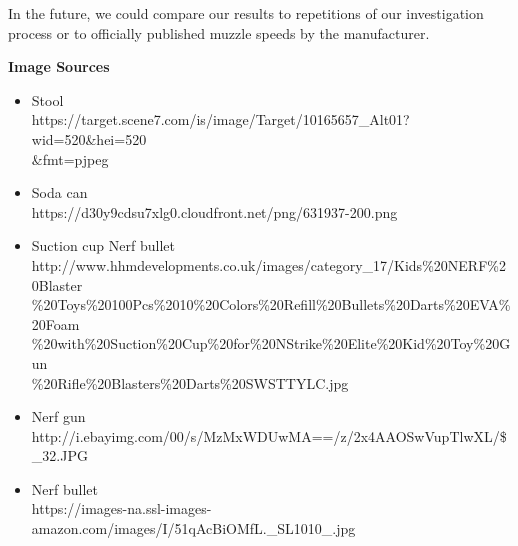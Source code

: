 \documentclass[12pt]{article}
\newcommand{\double}[0]{\par\null\par}
\newcommand{\bigheader}[1]{\LARGE\textbf{#1}\normalsize}
\begin{document}
In the future, we could compare our results to repetitions of our investigation process or to officially published muzzle
speeds by the manufacturer.

\double\bigheader{Image Sources}

\begin{itemize}
\item Stool \\
https://target.scene7.com/is/image/Target/10165657\_Alt01?wid=520\&hei=520\\
\&fmt=pjpeg
\item Soda can \\
https://d30y9cdsu7xlg0.cloudfront.net/png/631937-200.png
\item Suction cup Nerf bullet \\
http://www.hhmdevelopments.co.uk/images/category\_17/Kids\%20NERF\%20Blaster\\
\%20Toys\%20100Pcs\%2010\%20Colors\%20Refill\%20Bullets\%20Darts\%20EVA\%20Foam\\
\%20with\%20Suction\%20Cup\%20for\%20NStrike\%20Elite\%20Kid\%20Toy\%20Gun\\
\%20Rifle\%20Blasters\%20Darts\%20SWSTTYLC.jpg
\item Nerf gun \\
http://i.ebayimg.com/00/s/MzMxWDUwMA==/z/2x4AAOSwVupTlwXL/\$\_32.JPG
\item Nerf bullet \\
https://images-na.ssl-images-amazon.com/images/I/51qAcBiOMfL.\_SL1010\_.jpg
\end{itemize}
\end{document}
